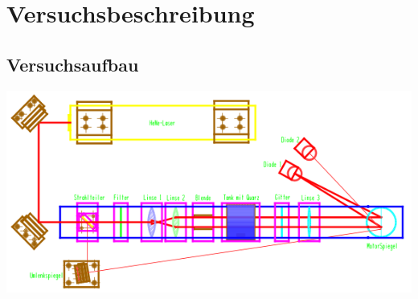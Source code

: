 \section{Versuchsbeschreibung}

\subsection{Versuchsaufbau}

\begin{center}
	\includegraphics[width = \textwidth]{Bilder/Aufbau.jpg}
\end{center}